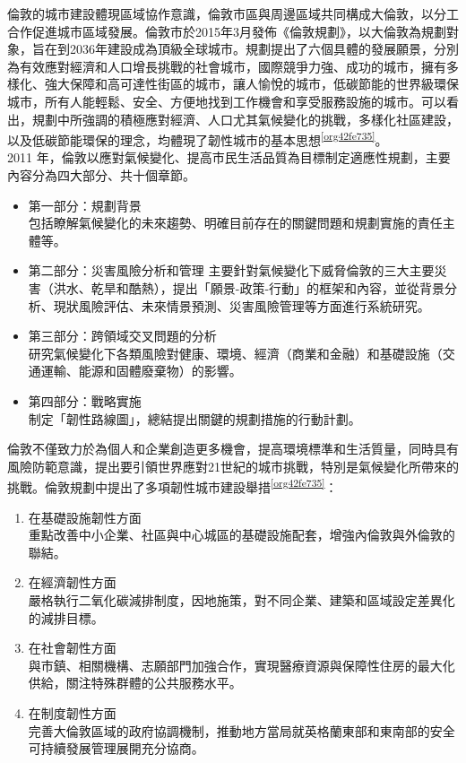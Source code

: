 \documentclass[a4paper,12pt]{article}
\begin{document}
\begin{enumerate}
倫敦的城市建設體現區域協作意識，倫敦市區與周邊區域共同構成大倫敦，以分工合作促進城市區域發展。倫敦市於2015年3月發佈《倫敦規劃》，以大倫敦為規劃對象，旨在到2036年建設成為頂級全球城市。規劃提出了六個具體的發展願景，分別為有效應對經濟和人口增長挑戰的社會城市，國際競爭力強、成功的城市，擁有多樣化、強大保障和高可達性街區的城市，讓人愉悅的城市，低碳節能的世界級環保城市，所有人能輕鬆、安全、方便地找到工作機會和享受服務設施的城市。可以看出，規劃中所強調的積極應對經濟、人口尤其氣候變化的挑戰，多樣化社區建設，以及低碳節能環保的理念，均體現了韌性城市的基本思想\textsuperscript{\ref{org42fe735}}。\\

2011 年，倫敦以應對氣候變化、提高市民生活品質為目標制定適應性規劃，主要內容分為四大部分、共十個章節。\\
\begin{itemize}
\item 第一部分：規劃背景\\
包括瞭解氣候變化的未來趨勢、明確目前存在的關鍵問題和規劃實施的責任主體等。\\
\item 第二部分：災害風險分析和管理  主要針對氣候變化下威脅倫敦的三大主要災害（洪水、乾旱和酷熱），提出「願景-政策-行動」的框架和內容，並從背景分析、現狀風險評估、未來情景預測、災害風險管理等方面進行系統研究。\\
\item 第三部分：跨領域交叉問題的分析\\
研究氣候變化下各類風險對健康、環境、經濟（商業和金融）和基礎設施（交通運輸、能源和固體廢棄物）的影響。\\
\item 第四部分：戰略實施\\
制定「韌性路線圖」，總結提出關鍵的規劃措施的行動計劃。\\
\end{itemize}

倫敦不僅致力於為個人和企業創造更多機會，提高環境標準和生活質量，同時具有風險防範意識，提出要引領世界應對21世紀的城市挑戰，特別是氣候變化所帶來的挑戰。倫敦規劃中提出了多項韌性城市建設舉措\textsuperscript{\ref{org42fe735}}：\\
\begin{enumerate}
\item 在基礎設施韌性方面\\
重點改善中小企業、社區與中心城區的基礎設施配套，增強內倫敦與外倫敦的聯結。\\
\item 在經濟韌性方面\\
嚴格執行二氧化碳減排制度，因地施策，對不同企業、建築和區域設定差異化的減排目標。\\
\item 在社會韌性方面\\
與市鎮、相關機構、志願部門加強合作，實現醫療資源與保障性住房的最大化供給，關注特殊群體的公共服務水平。\\
\item 在制度韌性方面\\
完善大倫敦區域的政府協調機制，推動地方當局就英格蘭東部和東南部的安全可持續發展管理展開充分協商。\\
\end{enumerate}


\end{enumerate}
\end{document}
